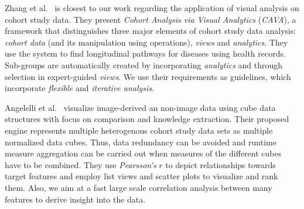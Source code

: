 \documentclass[journal]{style/vgtc} 			          %
\begin{document}
Zhang et al.~\cite{Zhang2014, Gotz2014} is closest to our work regarding the application of visual analysis on cohort study data.
They present \emph{Cohort Analysis via Visual Analytics} (\emph{CAVA}), a framework that distinguishes three major elements of cohort study data analysis: \emph{cohort data} (and its manipulation using operations), \emph{views} and \emph{analytics}.
They use the system to find longitudinal pathways for diseases using health records.
Sub-groups are automatically created by incorporating \emph{analytics} and through selection in expert-guided \emph{views}.
We use their requirements as guidelines, which incorporate \emph{flexible} and \emph{iterative analysis}. %

Angelelli et al.~\cite{Angelelli} visualize image-derived an non-image data using cube data structures with focus on comparison and knowledge extraction.
Their proposed engine represents multiple heterogenous cohort study data sets as multiple normalized data cubes.
Thus, data redundancy can be avoided and runtime measure aggregation can be carried out when measures of the different cubes have to be combined.
They use \emph{Pearsson's} $r$ to depict relationships towards target features and employ list views and scatter plots to visualize and rank them.
Also, we aim at a fast large scale correlation analysis between many features to derive insight into the data.
\end{document}
